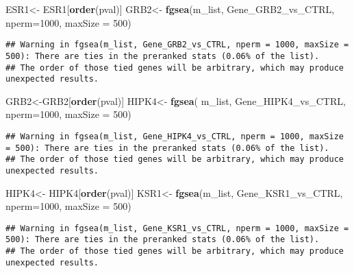 \documentclass[]{article}
\newenvironment{Shaded}{\begin{snugshade}}{\end{snugshade}}
\newcommand{\KeywordTok}[1]{\textcolor[rgb]{0.13,0.29,0.53}{\textbf{#1}}}
\newcommand{\DataTypeTok}[1]{\textcolor[rgb]{0.13,0.29,0.53}{#1}}
\newcommand{\DecValTok}[1]{\textcolor[rgb]{0.00,0.00,0.81}{#1}}
\newcommand{\StringTok}[1]{\textcolor[rgb]{0.31,0.60,0.02}{#1}}
\newcommand{\NormalTok}[1]{#1}
\begin{document}
\begin{Shaded}
\begin{Highlighting}[]
\NormalTok{ESR1<-}\StringTok{ }\NormalTok{ESR1[}\KeywordTok{order}\NormalTok{(pval)]}
\NormalTok{GRB2<-}\StringTok{ }\KeywordTok{fgsea}\NormalTok{(m_list, Gene_GRB2_vs_CTRL, }\DataTypeTok{nperm=}\DecValTok{1000}\NormalTok{, }\DataTypeTok{maxSize =} \DecValTok{500}\NormalTok{)}
\end{Highlighting}
\end{Shaded}

\begin{verbatim}
## Warning in fgsea(m_list, Gene_GRB2_vs_CTRL, nperm = 1000, maxSize = 500): There are ties in the preranked stats (0.06% of the list).
## The order of those tied genes will be arbitrary, which may produce unexpected results.
\end{verbatim}

\begin{Shaded}
\begin{Highlighting}[]
\NormalTok{GRB2<-GRB2[}\KeywordTok{order}\NormalTok{(pval)]}
\NormalTok{HIPK4<-}\StringTok{ }\KeywordTok{fgsea}\NormalTok{( m_list, Gene_HIPK4_vs_CTRL, }\DataTypeTok{nperm=}\DecValTok{1000}\NormalTok{, }\DataTypeTok{maxSize =} \DecValTok{500}\NormalTok{)}
\end{Highlighting}
\end{Shaded}

\begin{verbatim}
## Warning in fgsea(m_list, Gene_HIPK4_vs_CTRL, nperm = 1000, maxSize = 500): There are ties in the preranked stats (0.06% of the list).
## The order of those tied genes will be arbitrary, which may produce unexpected results.
\end{verbatim}

\begin{Shaded}
\begin{Highlighting}[]
\NormalTok{HIPK4<-}\StringTok{ }\NormalTok{HIPK4[}\KeywordTok{order}\NormalTok{(pval)]}
\NormalTok{KSR1<-}\StringTok{ }\KeywordTok{fgsea}\NormalTok{(m_list, Gene_KSR1_vs_CTRL, }\DataTypeTok{nperm=}\DecValTok{1000}\NormalTok{, }\DataTypeTok{maxSize =} \DecValTok{500}\NormalTok{)}
\end{Highlighting}
\end{Shaded}

\begin{verbatim}
## Warning in fgsea(m_list, Gene_KSR1_vs_CTRL, nperm = 1000, maxSize = 500): There are ties in the preranked stats (0.06% of the list).
## The order of those tied genes will be arbitrary, which may produce unexpected results.
\end{verbatim}
\end{document}
